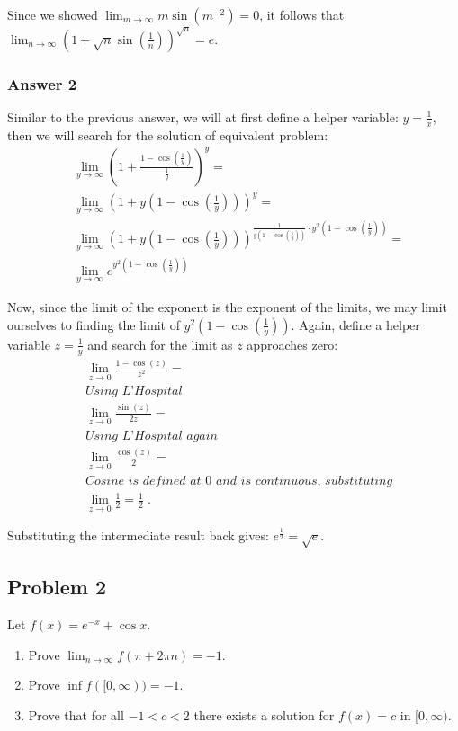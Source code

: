 \documentclass[a4paper]{article}
\begin{document}
Since we showed \(\lim_{m \to \infty}m\sin(m^{-2}) = 0\), it follows that
\(\lim_{n \to \infty}\left(1 +
    \sqrt{n}\sin\left(\frac{1}{n}\right)\right)^{\sqrt{n}} = e\).

\subsubsection{Answer 2}
\label{sec:orgheadline2}
Similar to the previous answer, we will at first define a helper variable:
\(y = \frac{1}{x}\), then we will search for the solution of equivalent problem:
\begin{align*}
  &\lim_{y \to \infty} \left(1 + \frac{1 - \cos\left(\frac{1}{y}\right)}{\frac{1}{y}}\right)^y = \\
  &\lim_{y \to \infty} \left(1 + y\left(1 - \cos\left(\frac{1}{y}\right)\right)\right)^y = \\
  &\lim_{y \to \infty} \left(1 + 
    y\left(1 - \cos\left(\frac{1}{y}\right)\right)\right)^{
    \frac{1}{y(1 - \cos(\frac{1}{y}))}\cdot y^2(1 - \cos(\frac{1}{y}))} = \\
  &\lim_{y \to \infty}e^{y^2(1 - \cos(\frac{1}{y}))}
\end{align*}

Now, since the limit of the exponent is the exponent of the limits, we may
limit ourselves to finding the limit of \(y^2(1 - \cos(\frac{1}{y}))\).
Again, define a helper variable \(z = \frac{1}{y}\) and search for the limit as \(z\)
approaches zero:
\begin{align*}
  &\lim_{z \to 0} \frac{1 - \cos(z)}{z^2} = \\
  &\textit{Using L'Hospital} \\
  &\lim_{z \to 0} \frac{\sin(z)}{2z} = \\
  &\textit{Using L'Hospital again} \\
  &\lim_{z \to 0} \frac{\cos(z)}{2} = \\
  &\textit{Cosine is defined at 0 and is continuous, substituting} \\
  &\lim_{z \to 0} \frac{1}{2} = \frac{1}{2}\;.
\end{align*}

Substituting the intermediate result back gives: \(e^{\frac{1}{2}} = \sqrt{e}\).

\subsection{Problem 2}
\label{sec:orgheadline7}
Let \(f(x) = e^{-x} + \cos x\).
\begin{enumerate}
\item Prove \(\lim_{n \to \infty}f(\pi + 2\pi n) = -1\).
\item Prove \(\inf f([0, \infty)) = -1\).
\item Prove that for all \(-1 < c < 2\) there exists a solution for \(f(x) = c\) in
\([0, \infty)\).
\end{enumerate}
\end{document}
